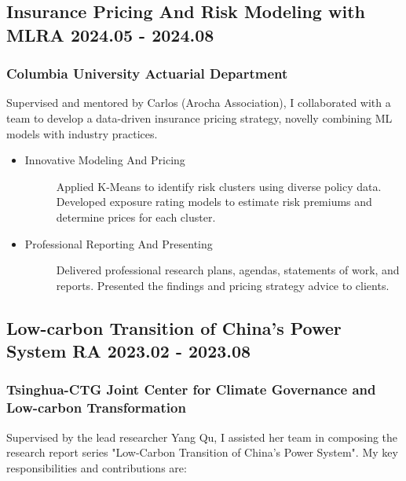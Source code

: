 \documentclass[a4paper]{article}
\begin{document}
\hypertarget{integrated-project}{
    \subsection{Insurance Pricing And Risk Modeling with ML\normalfont \hfill RA \hspace{70pt} 2024.05 - 2024.08}}
\subsubsection{Columbia University Actuarial Department} 
\vspace{3pt}
Supervised and mentored by Carlos (Arocha Association), I collaborated with a team to develop a data-driven insurance pricing strategy, novelly combining ML models with industry practices.
\begin{itemize}
    \item\begin{description}
        \item[Innovative Modeling And Pricing] Applied K-Means to identify risk clusters using diverse policy data. Developed exposure rating models to estimate risk premiums and determine prices for each cluster. 
    \end{description}
    \item\begin{description}
        \item[Professional Reporting And Presenting] Delivered professional research plans, agendas, statements of work, and reports. Presented the findings and pricing strategy advice to clients. 
    \end{description}
\end{itemize} 

\subsection{Low-carbon Transition of China's Power System \normalfont \hfill RA \hspace{70pt} 2023.02 - 2023.08} 
\subsubsection{Tsinghua-CTG Joint Center for Climate Governance and Low-carbon Transformation} 
\vspace{3pt}
    Supervised by the lead researcher Yang Qu, I assisted her team in composing the research report series "Low-Carbon Transition of China’s Power System". My key responsibilities and contributions are:
\end{document}
